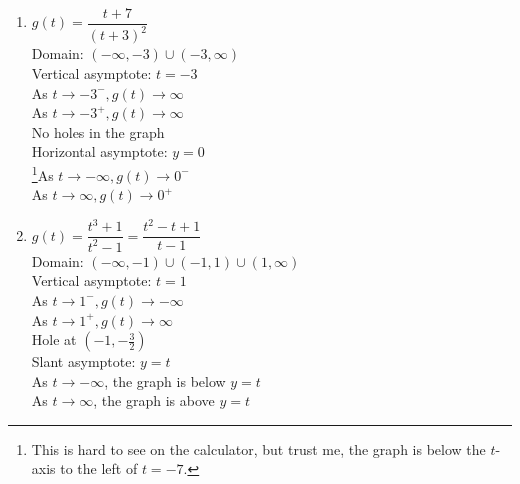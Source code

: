\begin{multicols}{2}
\begin{enumerate}
\setcounter{enumi}{\value{HW}}

\item $g(t) = \dfrac{t + 7}{(t + 3)^{2}}$ \\
Domain: $(-\infty, -3) \cup (-3, \infty)$\\
Vertical asymptote: $t = -3$\\
As $t \rightarrow -3^{-}, g(t) \rightarrow \infty$\\
As $t \rightarrow -3^{+}, g(t) \rightarrow \infty$\\
No holes in the graph\\
Horizontal asymptote: $y = 0$ \\
\footnote{This is hard to see on the calculator, but trust me, the graph is below the $t$-axis to the left of $t = -7$.}As $t \rightarrow -\infty, g(t) \rightarrow 0^{-}$\\
As $t \rightarrow \infty, g(t) \rightarrow 0^{+}$\\

\vfill

\columnbreak

\item $g(t) = \dfrac{t^{3} + 1}{t^{2} - 1} = \dfrac{t^{2} - t+ 1}{t-1}$\\
Domain: $(-\infty, -1) \cup (-1, 1) \cup (1, \infty)$\\
Vertical asymptote: $t = 1$\\
As $t \rightarrow 1^{-}, g(t) \rightarrow -\infty$\\
As $t \rightarrow 1^{+}, g(t) \rightarrow \infty$\\
Hole at $(-1, -\frac{3}{2})$\\
Slant asymptote: $y=t$  \\
As $t \rightarrow -\infty$, the graph is below $y=t$\\
As $t \rightarrow \infty$, the graph is above $y=t$\\

\setcounter{HW}{\value{enumi}}
\end{enumerate}
\end{multicols}

